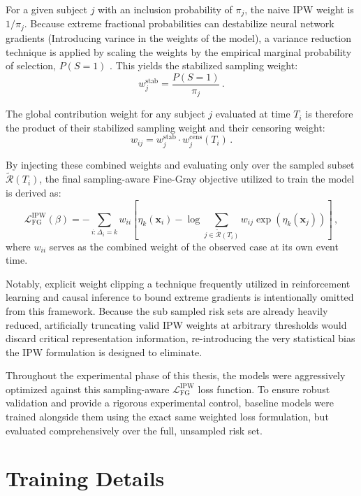\documentclass[a4paper,twoside,12pt]{report}
\begin{document}
For a given subject $j$ with an inclusion probability of $\pi_j$, the naive IPW weight is $1/\pi_j$. Because extreme fractional probabilities can destabilize neural network gradients (Introducing varince in the weights of the model), a variance reduction technique is applied by scaling the weights by the empirical marginal probability of selection, $P(S=1)$ \citep{Robins2000, Hernan2000}. This yields the stabilized sampling weight:
$$ w_j^{\text{stab}} = \frac{P(S=1)}{\pi_j} \,.$$

The global contribution weight for any subject $j$ evaluated at time $T_i$ is therefore the product of their stabilized sampling weight and their censoring weight:
$$ w_{ij} = w_j^{\text{stab}} \cdot w_j^{\text{cens}}(T_i) \,.$$

By injecting these combined weights and evaluating only over the sampled subset $\tilde{\mathcal{R}}(T_i)$, the final sampling-aware Fine-Gray objective utilized to train the model is derived as:
$$ \mathcal{L}_{\text{FG}}^{\text{IPW}}(\beta) = -\sum_{i:\Delta_i = k} w_{ii} \left[ \eta_k(\mathbf{x}_i) - \log \sum_{j \in \tilde{\mathcal{R}}(T_i)} w_{ij} \exp(\eta_k(\mathbf{x}_j)) \right] \,,$$
where $w_{ii}$ serves as the combined weight of the observed case at its own event time. 

Notably, explicit weight clipping a technique frequently utilized in reinforcement learning and causal inference to bound extreme gradients is intentionally omitted from this framework. Because the sub sampled risk sets are already heavily reduced, artificially truncating valid IPW weights at arbitrary thresholds would discard critical representation information, re-introducing the very statistical bias the IPW formulation is designed to eliminate. 

Throughout the experimental phase of this thesis, the models were aggressively optimized against this sampling-aware $\mathcal{L}_{\text{FG}}^{\text{IPW}}$ loss function. To ensure robust validation and provide a rigorous experimental control, baseline models were trained alongside them using the exact same weighted loss formulation, but evaluated comprehensively over the full, unsampled risk set.


\section{Training Details}
\end{document}
